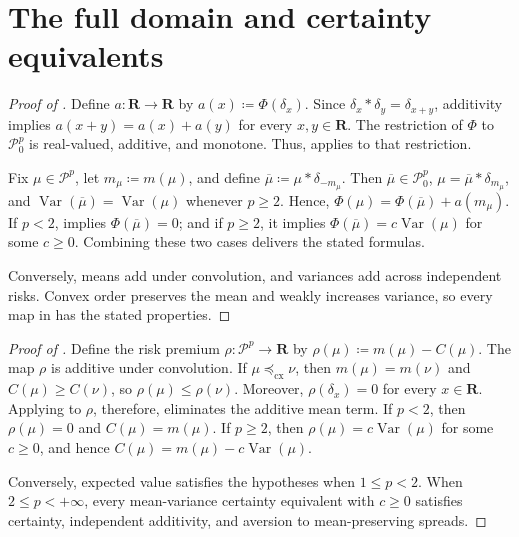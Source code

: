 \documentclass[11pt]{amsart}
\theoremstyle{plain}
\theoremstyle{definition}
\theoremstyle{remark}
\numberwithin{equation}{section}
\newcommand{\1}{\mathbf 1}
\begin{document}
\section{The full domain and certainty equivalents}

\begin{proof}[Proof of ]
Define \(a\colon\mathbf R\to\mathbf R\) by \(a(x)\coloneqq\Phi(\delta_x)\). Since \(\delta_x*\delta_y=\delta_{x+y}\), additivity implies \(a(x+y)=a(x)+a(y)\) for every \(x,y\in\mathbf R\). The restriction of \(\Phi\) to \(\mathcal P_0^p\) is real-valued, additive, and monotone. Thus,  applies to that restriction.

Fix \(\mu\in\mathcal P^p\), let \(m_\mu\coloneqq m(\mu)\), and define \(\overline\mu\coloneqq\mu*\delta_{-m_\mu}\). Then \(\overline\mu\in\mathcal P_0^p\), \(\mu=\overline\mu*\delta_{m_\mu}\), and \(\operatorname{Var}(\overline\mu)=\operatorname{Var}(\mu)\) whenever \(p\geq2\). Hence, \(\Phi(\mu)=\Phi(\overline\mu)+a(m_\mu)\). If \(p<2\),  implies \(\Phi(\overline\mu)=0\); and if \(p\geq2\), it implies \(\Phi(\overline\mu)=c\operatorname{Var}(\mu)\) for some \(c\geq0\). Combining these two cases delivers the stated formulas.

Conversely, means add under convolution, and variances add across independent risks. Convex order preserves the mean and weakly increases variance, so every map in  has the stated properties.
\end{proof}

\begin{proof}[Proof of ]
Define the risk premium \(\rho\colon\mathcal P^p\to\mathbf R\) by \(\rho(\mu)\coloneqq m(\mu)-C(\mu)\). The map \(\rho\) is additive under convolution. If \(\mu\preceq_{\mathrm{cx}}\nu\), then \(m(\mu)=m(\nu)\) and \(C(\mu)\geq C(\nu)\), so \(\rho(\mu)\leq\rho(\nu)\). Moreover, \(\rho(\delta_x)=0\) for every \(x\in\mathbf R\). Applying  to \(\rho\), therefore, eliminates the additive mean term. If \(p<2\), then \(\rho(\mu)=0\) and \(C(\mu)=m(\mu)\). If \(p\geq2\), then \(\rho(\mu)=c\operatorname{Var}(\mu)\) for some \(c\geq0\), and hence \(C(\mu)=m(\mu)-c\operatorname{Var}(\mu)\).

Conversely, expected value satisfies the hypotheses when \(1\leq p<2\). When \(2\leq p<+\infty\), every mean-variance certainty equivalent with \(c\geq0\) satisfies certainty, independent additivity, and aversion to mean-preserving spreads.
\end{proof}



\end{document}
